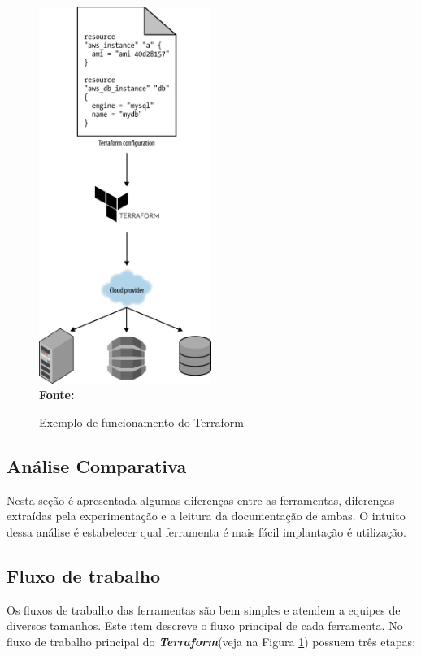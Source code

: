   \begin{figure}[ht]
	\centering	
	\caption[\hspace{0.1cm}Exemplo de funcionamento do Terraform]{Exemplo de funcionamento do Terraform}
	\vspace{-0.4cm}
	\includegraphics[width=0.5\textwidth]{figuras/terraform-working.png}
	 \vspace{-0.2cm}
	\\\textbf{\footnotesize Fonte: \cite{oreilly}}
	\label{fig:figura7}
\end{figure}
\vspace{-0.5cm}


\subsection{ Análise Comparativa }

Nesta seção é apresentada algumas diferenças entre as ferramentas, diferenças extraídas pela experimentação e a leitura da documentação de ambas. O intuito dessa análise é estabelecer qual ferramenta é mais fácil implantação é utilização.

\subsection{Fluxo de trabalho}
Os fluxos de trabalho  das ferramentas são bem simples e atendem a equipes de diversos tamanhos. Este item descreve o fluxo principal de cada ferramenta. No fluxo de trabalho principal do \textbf{\textit{Terraform}}(veja na Figura \ref{fig:figura7}) possuem três etapas: 

